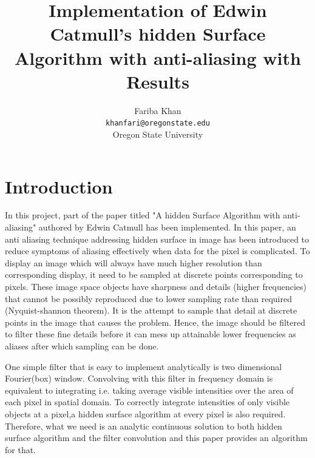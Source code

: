 \documentclass{acmsiggraph}               %
\title{Implementation of Edwin Catmull's hidden Surface Algorithm with 
anti-aliasing with Results}
\author{Fariba Khan \\ \small\texttt{khanfari@oregonstate.edu}\\ Oregon State 
University}
\begin{document}

\maketitle




\copyrightspace









\section{Introduction}
\label{sec:Introduction}
In this project, part of the paper titled "A hidden Surface Algorithm with 
anti-aliasing" authored by Edwin Catmull\cite{0} has been implemented. In this 
paper, an anti aliasing technique addressing hidden surface in image has been 
introduced to reduce symptoms of aliasing effectively when data for the pixel is 
complicated. To display an image which will always have much higher resolution than 
corresponding display, it need to be sampled at discrete points corresponding to 
pixels. These image space objects have sharpness and details (higher frequencies) 
that cannot be possibly reproduced due to lower sampling rate than required 
(Nyquist-shannon theorem). It is the attempt to sample that detail at discrete 
points in the image that causes the problem. Hence, the image should be filtered to 
filter these fine details before it can mess up attainable lower frequencies as 
aliases after which sampling can be done. 

One simple filter that is easy to implement analytically is two dimensional Fourier(box) window. Convolving with this filter in frequency domain is equivalent to integrating i.e. taking average visible intensities over the area of each pixel in spatial domain. To correctly integrate intensities of only visible objects at a pixel,a hidden surface algorithm at every pixel is also required. Therefore, what we need is an analytic continuous solution to both hidden surface algorithm and the filter convolution and this paper provides an algorithm for that.
\keywordlist
\end{document}
